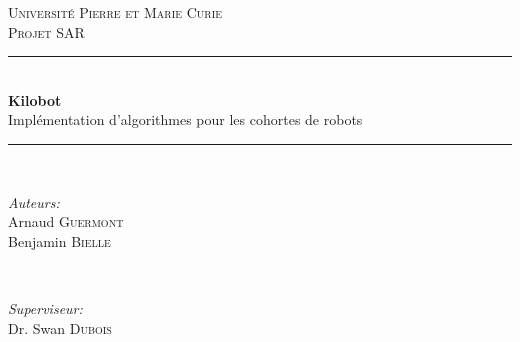 \documentclass[a4paper,8pt]{report}
\begin{document}
\begin{titlepage}
\newcommand{\HRule}{\rule{\linewidth}{0.5mm}} %
\center %
 

\textsc{\LARGE Universit\'e Pierre et Marie Curie}\\[1.5cm] %
\textsc{\Large Projet SAR}\\[0.5cm] %


\HRule \\[0.4cm]
{ \Huge \bfseries Kilobot}\\[0.4cm] %
Impl\'ementation d'algorithmes pour les cohortes de robots
\HRule \\[1.5cm]
 

\begin{minipage}{0.4\textwidth}
\begin{flushleft} \large
\emph{Auteurs:}\\
Arnaud \textsc{Guermont} %
\\Benjamin \textsc{Bielle} %
\end{flushleft}
\end{minipage}
~
\begin{minipage}{0.4\textwidth}
\begin{flushright} \large
\emph{Superviseur:} \\
Dr. Swan \textsc{Dubois} %
\end{flushright}
\end{minipage}\\[4cm]



\end{titlepage}
\end{document}
